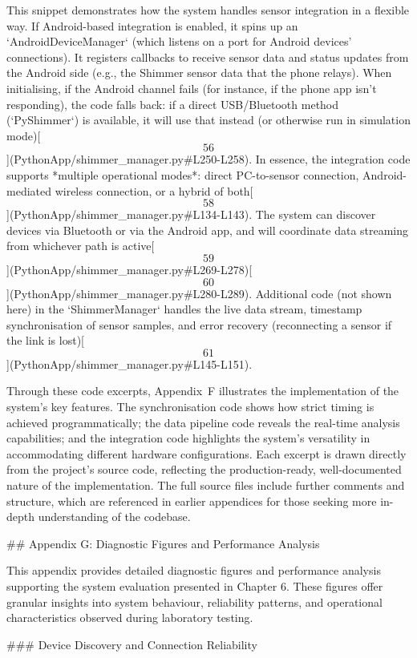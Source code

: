 \documentclass[12pt,a4paper]{article}
\begin{document}
{This snippet demonstrates how the system handles sensor integration in a
flexible way. If Android-based integration is enabled, it spins up an
`AndroidDeviceManager` (which listens on a port for Android devices'
connections). It registers callbacks to receive sensor data and status
updates from the Android side (e.g., the Shimmer sensor data that the
phone relays). When initialising, if the Android channel fails (for
instance, if the phone app isn't responding), the code falls back: if a
direct USB/Bluetooth method (`PyShimmer`) is available, it will use that
instead (or otherwise run in simulation
mode)[\[56\]](PythonApp/shimmer_manager.py#L250-L258).
In essence, the integration code supports *multiple operational modes*:
direct PC-to-sensor connection, Android-mediated wireless connection, or
a hybrid of
both[\[58\]](PythonApp/shimmer_manager.py#L134-L143).
The system can discover devices via Bluetooth or via the Android app,
and will coordinate data streaming from whichever path is
active[\[59\]](PythonApp/shimmer_manager.py#L269-L278)[\[60\]](PythonApp/shimmer_manager.py#L280-L289).
Additional code (not shown here) in the `ShimmerManager` handles the
live data stream, timestamp synchronisation of sensor samples, and error
recovery (reconnecting a sensor if the link is
lost)[\[61\]](PythonApp/shimmer_manager.py#L145-L151).

Through these code excerpts, Appendix F illustrates the implementation
of the system's key features. The synchronisation code shows how strict
timing is achieved programmatically; the data pipeline code reveals the
real-time analysis capabilities; and the integration code highlights the
system's versatility in accommodating different hardware configurations.
Each excerpt is drawn directly from the project's source code,
reflecting the production-ready, well-documented nature of the
implementation. The full source files include further comments and
structure, which are referenced in earlier appendices for those seeking
more in-depth understanding of the codebase.

## Appendix G: Diagnostic Figures and Performance Analysis

This appendix provides detailed diagnostic figures and performance analysis supporting the system evaluation presented in Chapter 6. These figures offer granular insights into system behaviour, reliability patterns, and operational characteristics observed during laboratory testing.

### Device Discovery and Connection Reliability

}
\end{document}
